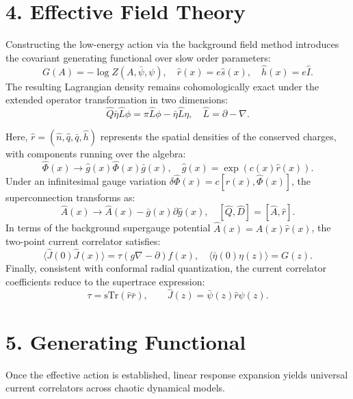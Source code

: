 \documentclass[10pt,twocolumn]{article}
\begin{document}
\section*{4. Effective Field Theory}
Constructing the low-energy action via the background field method introduces the covariant generating functional over slow order parameters:
\begin{equation}
G(A) = -\log Z(A, \bar{\psi}, \psi), \quad \hat{r}(x) = e \hat{s}(x), \quad \hat{h}(x) = e \hat{I}.
\end{equation}
The resulting Lagrangian density remains cohomologically exact under the extended operator transformation in two dimensions:
\begin{equation}
\hat{Q}\bar{\eta}\hat{L}\phi = \pi \hat{L}\phi - \bar{\eta}\hat{L}\eta, \quad \hat{L} = \partial - \nabla.
\end{equation}

\newpage
\noindent Here, $\hat{r} = (\hat{n}, \hat{q}, \bar{q}, \hat{h})$ represents the spatial densities of the conserved charges, with components running over the algebra:
\begin{equation}
\hat{\Phi}(x) \to \hat{g}(x)\hat{\Phi}(x)\bar{g}(x), \quad \hat{g}(x) = \exp(c(x)\hat{r}(x)).
\end{equation}
Under an infinitesimal gauge variation $\delta\hat{\Phi}(x) = c[\hat{r}(x), \hat{\Phi}(x)]$, the superconnection transforms as:
\begin{equation}
\hat{A}(x) \to \hat{A}(x) - \bar{g}(x)\partial \hat{g}(x), \quad [\hat{Q}, \hat{D}] = [\hat{A}, \hat{r}].
\end{equation}
In terms of the background supergauge potential $\hat{A}(x) = A(x)\hat{r}(x)$, the two-point current correlator satisfies:
\begin{equation}
\langle \hat{J}(0) \hat{J}(x) \rangle = \tau (g \nabla - \partial) f(x), \quad \langle \bar{\eta}(0)\eta(z) \rangle = G(z).
\end{equation}
Finally, consistent with conformal radial quantization, the current correlator coefficients reduce to the supertrace expression:
\begin{equation}
\tau = \mathrm{sTr}(\hat{r}\bar{r}), \qquad \hat{J}(z) = \bar{\psi}(z)\hat{r}\psi(z).
\end{equation}

\section*{5. Generating Functional}
Once the effective action is established, linear response expansion yields universal current correlators across chaotic dynamical models.
\end{document}
